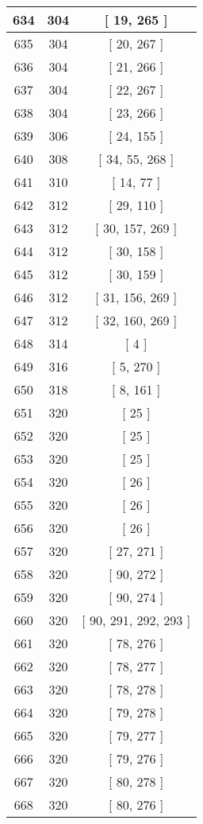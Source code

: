 \begin{center}
\begin{longtable}[H]{|| c c c ||}
\hline
634 & 304 & [ 19, 265 ] \\ 
\hline
635 & 304 & [ 20, 267 ] \\ 
\hline
636 & 304 & [ 21, 266 ] \\ 
\hline
637 & 304 & [ 22, 267 ] \\ 
\hline
638 & 304 & [ 23, 266 ] \\ 
\hline
639 & 306 & [ 24, 155 ] \\ 
\hline
640 & 308 & [ 34, 55, 268 ] \\ 
\hline
641 & 310 & [ 14, 77 ] \\ 
\hline
642 & 312 & [ 29, 110 ] \\ 
\hline
643 & 312 & [ 30, 157, 269 ] \\ 
\hline
644 & 312 & [ 30, 158 ] \\ 
\hline
645 & 312 & [ 30, 159 ] \\ 
\hline
646 & 312 & [ 31, 156, 269 ] \\ 
\hline
647 & 312 & [ 32, 160, 269 ] \\ 
\hline
648 & 314 & [ 4 ] \\ 
\hline
649 & 316 & [ 5, 270 ] \\ 
\hline
650 & 318 & [ 8, 161 ] \\ 
\hline
651 & 320 & [ 25 ] \\ 
\hline
652 & 320 & [ 25 ] \\ 
\hline
653 & 320 & [ 25 ] \\ 
\hline
654 & 320 & [ 26 ] \\ 
\hline
655 & 320 & [ 26 ] \\ 
\hline
656 & 320 & [ 26 ] \\ 
\hline
657 & 320 & [ 27, 271 ] \\ 
\hline
658 & 320 & [ 90, 272 ] \\ 
\hline
659 & 320 & [ 90, 274 ] \\ 
\hline
660 & 320 & [ 90, 291, 292, 293 ] \\ 
\hline
661 & 320 & [ 78, 276 ] \\ 
\hline
662 & 320 & [ 78, 277 ] \\ 
\hline
663 & 320 & [ 78, 278 ] \\ 
\hline
664 & 320 & [ 79, 278 ] \\ 
\hline
665 & 320 & [ 79, 277 ] \\ 
\hline
666 & 320 & [ 79, 276 ] \\ 
\hline
667 & 320 & [ 80, 278 ] \\ 
\hline
668 & 320 & [ 80, 276 ] \\ 

\end{longtable}
\end{center}
